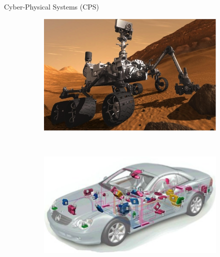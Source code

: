 \documentclass{beamer}
\begin{document}
\begin{frame}{Cyber-Physical Systems (CPS)}
\begin{figure}
    \centering
    \begin{subfigure}[b]{0.3\textwidth}
        \includegraphics[width=\textwidth]{figures/step1_figureB.png}
    \end{subfigure}
    ~
    \begin{subfigure}[b]{0.3\textwidth}
        \includegraphics[width=\textwidth]{figures/step1_figureC.png}
    \end{subfigure}
    ~
    \begin{subfigure}[b]{0.3\textwidth}

\end{subfigure}
\end{figure}
\end{frame}
\end{document}

